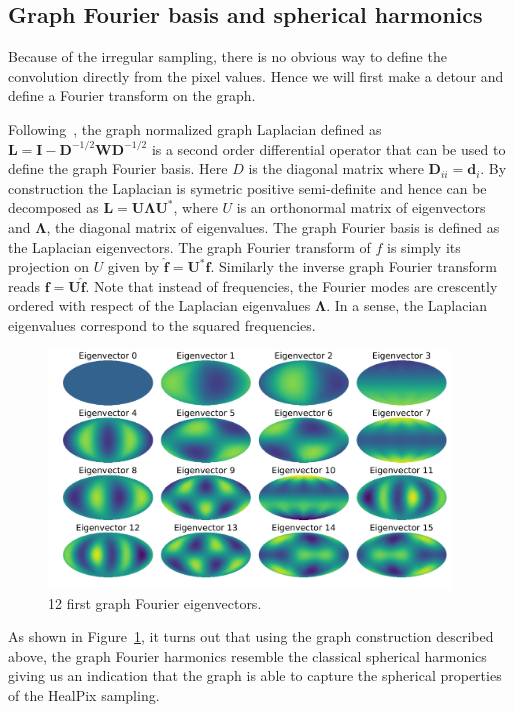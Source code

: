 \documentclass[final,twocolumn,3p,times,authoryear]{elsarticle}
\newcommand{\todo}[1]{{\color[rgb]{.6,.1,.6}{#1}}}
\renewcommand{\b}[1]{{\bm{#1}}}   %
\newcommand{\1}{\b{1}}              %
\newcommand{\0}{\b{0}}              %
\renewcommand{\L}{\b{L}} %
\newcommand{\W}{\b{W}}
\newcommand{\I}{\b{I}}
\newcommand{\D}{\b{D}}
\newcommand{\U}{\b{U}}
\newcommand{\bLambda}{\b{\Lambda}}
\begin{document}
\subsection{Graph Fourier basis and spherical harmonics}
\todo{Add a few extra references}

Because of the irregular sampling, there is no obvious way to define the convolution
directly from the pixel values. Hence we will first make a detour and define a Fourier transform on the
graph.

Following~\cite{shuman2013emerging}, the graph normalized graph Laplacian
defined as $\L = \I - \D^{-1/2} \W \D^{-1/2}$ is a second order differential operator
that can be used to define the graph Fourier basis. Here $D$ is the diagonal
matrix where $\D_{ii}=\b{d}_i$. By construction the Laplacian is symetric positive
semi-definite and hence can be decomposed as $\L=\U \bLambda \U^*$, where $U$ is an
orthonormal matrix of eigenvectors and $\bLambda$, the diagonal matrix of
eigenvalues. The graph Fourier basis is defined as the Laplacian eigenvectors.
The graph Fourier transform of $f$ is simply its projection on $U$ given by
$\hat{\b{f}}=\U^*\b{f}$. Similarly the inverse graph Fourier transform reads $\b{f}=\U\hat{\b{f}}$.
Note that instead of frequencies, the Fourier modes are crescently ordered with
respect of the Laplacian eigenvalues $\bLambda$. In a sense, the Laplacian
eigenvalues correspond to the squared frequencies.

\begin{figure}[!ht]
\centering
\includegraphics[width=0.95\textwidth]{figures/eigenvectors.pdf}
\caption{12 first graph Fourier eigenvectors.}
\label{fig:graph_harmonics}
\end{figure}

As shown in Figure~\ref{fig:graph_harmonics}, it turns out that using the graph
construction described above, the graph Fourier harmonics resemble the
classical spherical harmonics giving us an indication that the graph is able to
capture the spherical properties of the HealPix sampling.
\end{document}
